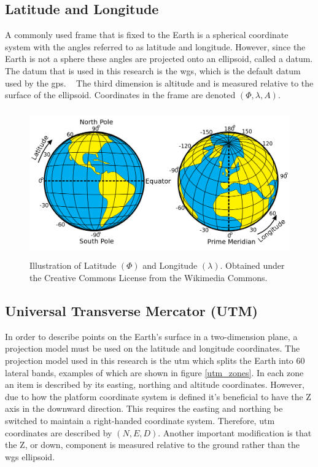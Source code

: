 \subsection{Latitude and Longitude}

A commonly used frame that is fixed to the Earth is a spherical coordinate system with the angles referred to as latitude and longitude. However, since the Earth is not a sphere these angles are projected onto an ellipsoid, called a datum.  The datum that is used in this research is the \ac{wgs}, which is the default datum used by the \acf{gps}. ~\citep{datums:2016}  The third dimension is altitude and is measured relative to the surface of the ellipsoid.  Coordinates in the frame are denoted $(\Phi, \lambda, A)$.

\begin{figure}
	\centering
    \includegraphics[height=2.5in]{figures/latitudelongitude.png}
    \caption[Latitude and longitude]{Illustration of Latitude $(\Phi)$ and Longitude $(\lambda)$. Obtained under the Creative Commons License from the Wikimedia Commons.}
\end{figure}

\subsection{Universal Transverse Mercator (UTM)}
\label{section:utm}

In order to describe points on the Earth's surface in a two-dimension plane, a projection model must be used on the latitude and longitude coordinates.  The projection model used in this research is the \acf{utm} which splits the Earth into 60 lateral bands, examples of which are shown in figure \ref{utm_zones}.  In each zone an item is described by its easting, northing and altitude coordinates.  However, due to how the platform coordinate system is defined it's beneficial to have the Z axis in the downward direction.  This requires the easting and northing be switched to maintain a right-handed coordinate system. Therefore, \acf{utm} coordinates are described by $(N,E,D)$.  Another important modification is that the Z, or down, component is measured relative to the ground rather than the \ac{wgs} ellipsoid. 

